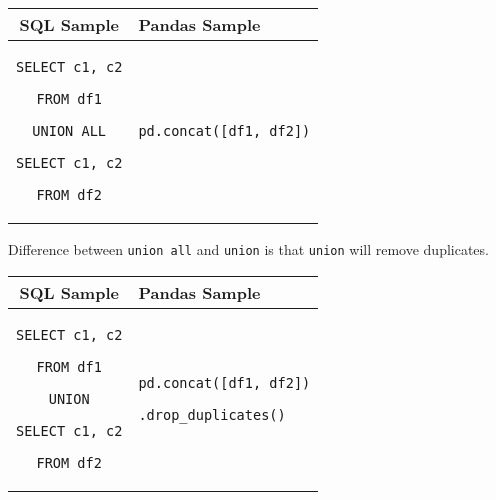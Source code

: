 \documentclass[11pt]{article}
\providecommand{\tabularnewline}{\\}
\begin{document}
\label{union}

\begin{longtable}[c]{|@{}c|l|}
\hline 
\begin{minipage}[b]{0.29\columnwidth}%
\centering SQL Sample\strut %
\end{minipage} &
\begin{minipage}[b]{0.34\columnwidth}%
\centering Pandas Sample\strut %
\end{minipage}\tabularnewline
\endhead
\hline 
\begin{minipage}[t]{0.29\columnwidth}%
\centering \texttt{SELECT\ c1,\ c2}

\texttt{FROM\ df1}

\texttt{UNION\ ALL}

\texttt{SELECT\ c1,\ c2}

\texttt{FROM\ df2}\strut %
\end{minipage} &
\begin{minipage}[t]{0.34\columnwidth}%
\centering \texttt{pd.concat({[}df1,\ df2{]})}\strut %
\end{minipage}\tabularnewline
\hline 
\end{longtable}

Difference between \texttt{union\ all} and \texttt{union} is that
\texttt{union} will remove duplicates.

\begin{longtable}[c]{|@{}c|l|}
\hline 
\begin{minipage}[b]{0.29\columnwidth}%
\centering SQL Sample\strut %
\end{minipage} &
\begin{minipage}[b]{0.34\columnwidth}%
\centering Pandas Sample\strut %
\end{minipage}\tabularnewline
\endhead
\hline 
\begin{minipage}[t]{0.29\columnwidth}%
\centering \texttt{SELECT\ c1,\ c2}

\texttt{FROM\ df1}

\texttt{UNION}

\texttt{SELECT\ c1,\ c2}

\texttt{FROM\ df2}\strut %
\end{minipage} &
\begin{minipage}[t]{0.34\columnwidth}%
\centering \texttt{pd.concat({[}df1,\ df2{]})}

\texttt{.drop\_duplicates()}\strut %
\end{minipage}\tabularnewline
\hline 
\end{longtable}
\end{document}
